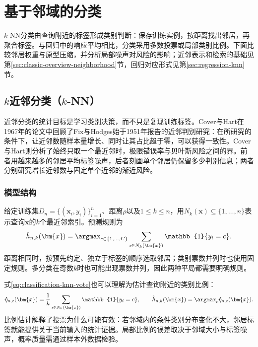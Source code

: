 \section{基于邻域的分类}
\label{sec:classification-instances}

$k$-NN分类由查询附近的标签形成类别判断：保存训练实例，按距离找出邻居，再聚合标签。与回归中的响应平均相比，分类采用多数投票或局部类别比例。下面比较邻居权重与原型压缩，并分析局部噪声对风险的影响；近邻表示和检索的基础见第\ref{sec:classic-overview-neighborhood}节，回归对应形式见第\ref{sec:regression-knn}节。

\subsection{$k$近邻分类（$k$-NN）}
\label{sec:classification-knn}

近邻分类的统计目标是学习类别决策，而不只是复现训练标签。Cover与Hart在1967年的论文中回顾了Fix与Hodges始于1951年报告的近邻判别研究：在所研究的条件下，让近邻数随样本量增长、同时让其占比趋于零，可以获得一致性。Cover与Hart则分析了始终只取一个最近邻时，极限错误率与贝叶斯风险之间的界。前者用越来越多的邻居平均标签噪声，后者刻画单个邻居仍保留多少判别信息；两者分别研究增长近邻数与固定单个近邻的渐近风险。

\subsubsection{模型结构}
\label{sec:classification-knn-structure}

给定训练集$D_n=\{(\bm{x}_i,y_i)\}_{i=1}^n$、距离$\rho$以及$1\leq k\leq n$，用$N_k(\bm{x})\subseteq\{1,\ldots,n\}$表示查询$\bm{x}$的$k$个最近邻索引。预测规则为
\begin{equation}
  \hat h_{n,k}(\bm{x})
  =\argmax_{c\in\{1,\ldots,C\}}
  \sum_{i\in N_k(\bm{x})}\mathbb{1}\{y_i=c\}.
  \label{eq:classification-knn-vote}
\end{equation}
距离相同时，按预先约定、独立于标签的顺序选取邻居；类别票数并列时也使用固定规则。多分类在奇数$k$时也可能出现票数并列，因此两种平局都需要明确规则。

式\eqref{eq:classification-knn-vote}也可以理解为估计查询附近的类别比例：
\begin{equation}
  \hat\eta_{n,c}(\bm{x})
  =\frac{1}{k}\sum_{i\in N_k(\bm{x})}\mathbb{1}\{y_i=c\},
  \qquad
  \hat h_{n,k}(\bm{x})=\argmax_c\hat\eta_{n,c}(\bm{x}).
  \label{eq:classification-knn-posterior}
\end{equation}
比例估计解释了投票为什么可能有效：若邻域内的条件类别分布变化不大，邻居标签就能提供关于当前输入的统计证据。局部比例的误差取决于邻域大小与标签噪声，概率质量需通过样本外数据检验。

